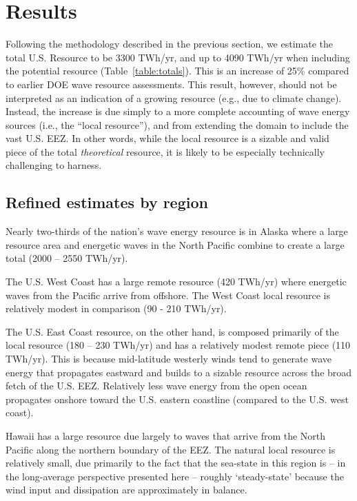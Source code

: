 \section{Results}
\label{sec:results}

Following the methodology described in the previous section, we estimate the total U.S. Resource to be 3300 TWh/yr, and up to 4090 TWh/yr when including the potential resource (Table~\ref{table:totals}). This is an increase of  25\% compared to earlier DOE wave resource assessments. This result, however, should not be interpreted as an indication of a growing resource (e.g., due to climate change). Instead, the increase is due simply to a more complete accounting of wave energy sources (i.e., the ``local resource''), and from extending the domain to include the vast U.S. EEZ. In other words, while the local resource is a sizable and valid piece of the total \textit{theoretical} resource, it is likely to be especially technically challenging to harness.

\subsection{Refined estimates by region}

Nearly two-thirds of the nation's wave energy resource is in Alaska where a large resource area and energetic waves in the North Pacific combine to create a large total (2000 – 2550 TWh/yr).

The U.S. West Coast has a large remote resource (420 TWh/yr) where energetic waves from the Pacific arrive from offshore.  The West Coast local resource is relatively modest in comparison (90 - 210 TWh/yr).

The U.S. East Coast resource, on the other hand, is composed primarily of the local resource (180 – 230 TWh/yr) and has a relatively modest remote piece (110 TWh/yr). This is because mid-latitude westerly winds tend to generate wave energy that propagates eastward and builds to a sizable resource across the broad fetch of the U.S. EEZ. Relatively less wave energy from the open ocean propagates onshore toward the U.S. eastern coastline (compared to the U.S. west coast).

Hawaii has a large resource due largely to waves that arrive from the North Pacific along the northern boundary of the EEZ. The natural local resource is relatively small, due primarily to the fact that the sea-state in this region is -- in the long-average perspective presented here -- roughly `steady-state' because the wind input and dissipation are approximately in balance.

